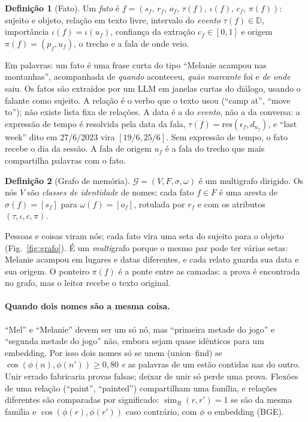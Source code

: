 \documentclass[10pt,twocolumn]{article}
\theoremstyle{definition}
\newtheorem{definicao}{Definição}
\newcommand{\G}{\mathcal{G}}
\newcommand{\sem}{\operatorname{sim}}
\begin{document}
\begin{definicao}[Fato]
Um \emph{fato} é
$f=(s_f,\,r_f,\,o_f,\,\tau(f),\,\iota(f),\,c_f,\,\pi(f))$: sujeito e objeto,
relação em texto livre, intervalo do \emph{evento} $\tau(f)\in\mathbb{D}$,
importância $\iota(f)=\iota(u_f)$, confiança da extração $c_f\in[0,1]$ e origem
$\pi(f)=(p_f,u_f)$, o trecho e a fala de onde veio.
\end{definicao}

Em palavras: um fato é uma frase curta do tipo ``Melanie acampou nas
montanhas'', acompanhada de \emph{quando} aconteceu, \emph{quão marcante} foi
e \emph{de onde} saiu. Os fatos são extraídos por um LLM em janelas curtas do
diálogo, usando o falante como sujeito. A relação é o verbo que o texto usou
(``camp at'', ``move to''); não existe lista fixa de relações. A data é a do
\emph{evento}, não a da conversa: a expressão de tempo é resolvida pela data
da fala, $\tau(f)=\mathrm{res}(\epsilon_f,d_{u_f})$, e ``last week'' dito em
27/6/2023 vira $[19/6,25/6]$. Sem expressão de tempo, o fato recebe o dia da
sessão. A fala de origem $u_f$ é a fala do trecho que mais compartilha
palavras com o fato.

\begin{definicao}[Grafo de memória]
$\G=(V,F,\sigma,\omega)$ é um multigrafo dirigido. Os nós $V$ são
\emph{classes de identidade} de nomes; cada fato $f\in F$ é uma aresta de
$\sigma(f)=[s_f]$ para $\omega(f)=[o_f]$, rotulada por $r_f$ e com os
atributos $(\tau,\iota,c,\pi)$.
\end{definicao}

Pessoas e coisas viram nós; cada fato vira uma seta do sujeito para o objeto
(Fig.~\ref{fig:grafo}). É um \emph{multi}grafo porque o mesmo par pode ter
várias setas: Melanie acampou em lugares e datas diferentes, e cada relato
guarda sua data e sua origem. O ponteiro $\pi(f)$ é a ponte entre as camadas:
a prova é encontrada no grafo, mas o leitor recebe o texto original.

\paragraph{Quando dois nomes são a mesma coisa.} ``Mel'' e ``Melanie'' devem
ser um só nó, mas ``primeira metade do jogo'' e ``segunda metade do jogo'' não,
embora sejam quase idênticos para um embedding. Por isso dois nomes só se
unem (union--find) se $\cos(\phi(n),\phi(n'))\ge0{,}80$ \emph{e} as palavras
de um estão contidas nas do outro. Unir errado fabricaria provas falsas;
deixar de unir só perde uma prova. Flexões de uma relação (``paint'',
``painted'') compartilham uma família, e relações diferentes são comparadas
por significado:
$\sem_R(r,r')=1$ se são da mesma família e $\cos(\phi(r),\phi(r'))$ caso
contrário, com $\phi$ o embedding (BGE).
\end{document}
